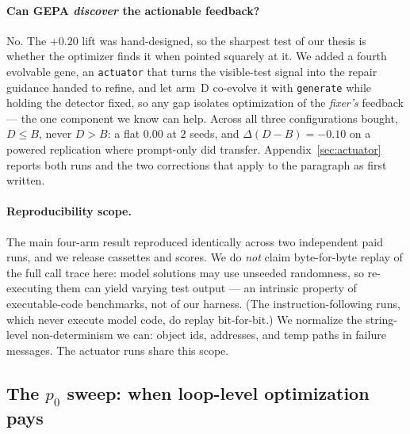 \documentclass[11pt]{article}
\newcommand{\dd}{\ensuremath{\Delta}}
\begin{document}
\paragraph{Can GEPA \emph{discover} the actionable feedback?} No. The $+0.20$ lift was
hand-designed, so the sharpest test of our thesis is whether the optimizer finds it when pointed
squarely at it. We added a fourth evolvable gene, an \texttt{actuator} that turns the visible-test
signal into the repair guidance handed to refine, and let arm~D co-evolve it with
\texttt{generate} while holding the detector fixed, so any gap isolates optimization of the
\emph{fixer's} feedback --- the one component we know can help. Across all three configurations
bought, $D \le B$, never $D > B$: a flat $0.00$ at $2$ seeds, and $\dd(D-B) = -0.10$ on a powered
replication where prompt-only did transfer. Appendix~\ref{sec:actuator} reports both runs and the
two corrections that apply to the paragraph as first written.

\paragraph{Reproducibility scope.} The main four-arm result reproduced identically across two
independent paid runs, and we release cassettes and scores. We do \emph{not} claim
byte-for-byte replay of the full call trace here: model solutions may use unseeded randomness,
so re-executing them can yield varying test output --- an intrinsic property of
executable-code benchmarks, not of our harness. (The instruction-following runs, which never
execute model code, do replay bit-for-bit.) We normalize the string-level non-determinism we
can: object ids, addresses, and temp paths in failure messages. The actuator runs share this
scope.


\subsection{The \texorpdfstring{$p_0$}{p0} sweep: when loop-level optimization pays}
\label{sec:p0}
\end{document}
